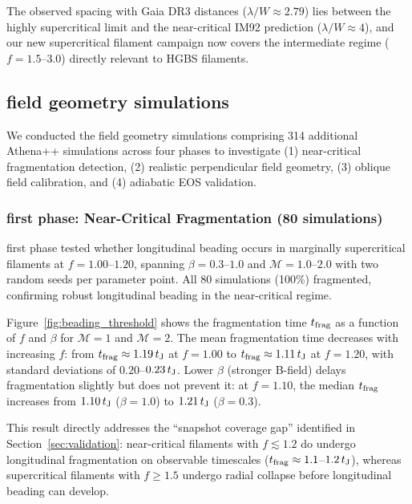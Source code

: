 \documentclass[twoside,twocolumn]{mnras}
\begin{document}
The observed spacing with Gaia DR3 distances ($\lambda/W \approx 2.79$) lies between the highly supercritical limit and the near-critical IM92 prediction ($\lambda/W \approx 4$), and our new supercritical filament campaign now covers the intermediate regime ($f = 1.5$--$3.0$) directly relevant to HGBS filaments.

\subsection{field geometry simulations}
\label{sec:fieldgeo}

We conducted the field geometry simulations comprising 314 additional Athena++ simulations across four phases to investigate (1) near-critical fragmentation detection, (2) realistic perpendicular field geometry, (3) oblique field calibration, and (4) adiabatic EOS validation.

\subsubsection{first phase: Near-Critical Fragmentation (80 simulations)}

first phase tested whether longitudinal beading occurs in marginally supercritical filaments at $f = 1.00$--$1.20$, spanning $\beta = 0.3$--$1.0$ and $\mathcal{M} = 1.0$--$2.0$ with two random seeds per parameter point. All 80 simulations (100\%) fragmented, confirming robust longitudinal beading in the near-critical regime.

Figure~\ref{fig:beading_threshold} shows the fragmentation time $t_{\rm frag}$ as a function of $f$ and $\beta$ for $\mathcal{M} = 1$ and $\mathcal{M} = 2$. The mean fragmentation time decreases with increasing $f$: from $t_{\rm frag} \approx 1.19\,t_{\rm J}$ at $f = 1.00$ to $t_{\rm frag} \approx 1.11\,t_{\rm J}$ at $f = 1.20$, with standard deviations of $0.20$--$0.23\,t_{\rm J}$. Lower $\beta$ (stronger B-field) delays fragmentation slightly but does not prevent it: at $f = 1.10$, the median $t_{\rm frag}$ increases from $1.10\,t_{\rm J}$ ($\beta = 1.0$) to $1.21\,t_{\rm J}$ ($\beta = 0.3$).

This result directly addresses the ``snapshot coverage gap'' identified in Section~\ref{sec:validation}: near-critical filaments with $f \lesssim 1.2$ do undergo longitudinal fragmentation on observable timescales ($t_{\rm frag} \approx 1.1$--$1.2\,t_{\rm J}$), whereas supercritical filaments with $f \geq 1.5$ undergo radial collapse before longitudinal beading can develop.
\end{document}
